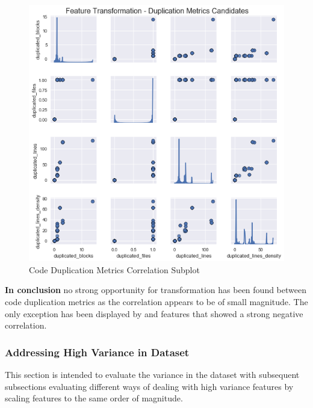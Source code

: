 \begin{figure}
    \centering
    \includegraphics[scale=0.75]{Figures/correlation/Attribute_Relationship_in_Duplication_Metrics.png}
    \caption{Code Duplication Metrics Correlation Subplot}
    \label{fig:correlation-code-duplication-metrics-subplot}
\end{figure}


\textbf{In conclusion} no strong opportunity for transformation has been found between code duplication metrics as the correlation appears to be of small magnitude. The only exception has been displayed by \duplicatedBlocks{} and \duplicatedFiles{} features that showed a strong negative correlation.
\FloatBarrier

\subsubsection{Addressing High Variance in Dataset}\label{sec:impl-data-analysis:dealing-with-variance}
This section is intended to evaluate the variance in the dataset with subsequent subsections evaluating different ways of dealing with high variance features by scaling features to the same order of magnitude.